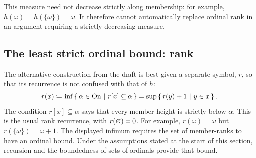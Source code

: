 This measure need not decrease strictly along membership: for example,
$h(\omega)=h(\{\omega\})=\omega$. It therefore cannot automatically replace
ordinal rank in an argument requiring a strictly decreasing measure.

\subsection{The least strict ordinal bound: rank}
The alternative construction from the draft is best given a separate
symbol, $r$, so that its recurrence is not confused with that of $h$:
\[
r(x)\,{\coloneqq}\,\inf\left\{\,\alpha\in\mathrm{On}\ \middle|\ r[x]\subseteq\alpha\,\right\}
       =\sup\left\{\,r(y)+1\ \middle|\ y\in x\,\right\}.
\]
The condition $r[x]\subseteq\alpha$ says that every member-height is
strictly below $\alpha$. This is the usual rank recurrence, with
$r(\varnothing)=0$. For example,
$r(\omega)=\omega$ but $r(\{\omega\})=\omega+1$.
The displayed infimum requires the set of member-ranks to have an ordinal
bound. Under the assumptions stated at the start of this section, recursion
and the boundedness of sets of ordinals provide that bound.


